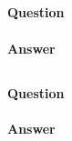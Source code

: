 \documentclass[12pt,letterpaper]{article}
\begin{document}
\subsection{}
\paragraph{Question}
\paragraph{Answer}

\subsection{}
\paragraph{Question}
\paragraph{Answer}

\tiny
%
\normalsize
\end{document}
